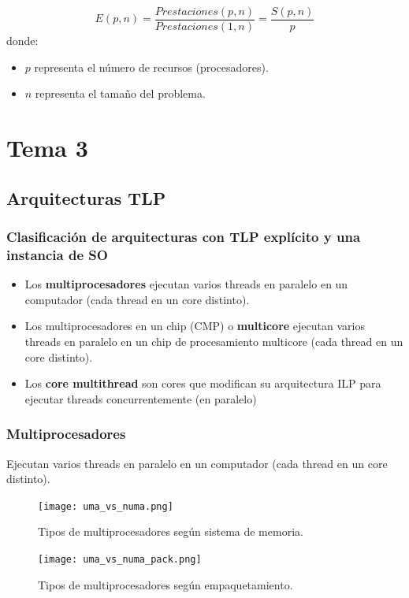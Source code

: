 \documentclass[12pt,spanish]{article}
\begin{document}
\begin{equation}
	E(p,n)=\frac{Prestaciones (p,n)}{Prestaciones (1,n)}=\frac{S(p,n)}{p}
\end{equation}
donde:
\begin{itemize}
	\item $p$ representa el número de recursos (procesadores).
	\item $n$ representa el tamaño del problema.
\end{itemize}


\newpage

\section{Tema 3}

\subsection{Arquitecturas TLP}

\subsubsection{Clasificación de arquitecturas con TLP explícito y una instancia de SO}

\begin{itemize}
	\item Los \textbf{multiprocesadores} ejecutan varios threads en paralelo en un computador (cada thread en un core distinto). 
	\item Los multiprocesadores en un chip (CMP) o \textbf{multicore} ejecutan varios threads en paralelo en un chip de procesamiento multicore (cada thread en un core distinto).
	\item Los \textbf{core multithread} son cores que modifican su arquitectura ILP para ejecutar threads concurrentemente (en paralelo)
\end{itemize}

\subsubsection{Multiprocesadores}
Ejecutan varios threads en paralelo en un computador (cada thread en un core distinto). 
\begin{figure}[H]
\centering
\texttt{[image: uma\_vs\_numa.png]}
\caption{Tipos de multiprocesadores según sistema de memoria.}
\end{figure}

\begin{figure}[H]
\centering
\texttt{[image: uma\_vs\_numa\_pack.png]}
\caption{Tipos de multiprocesadores según empaquetamiento.}
\end{figure}
\end{document}
